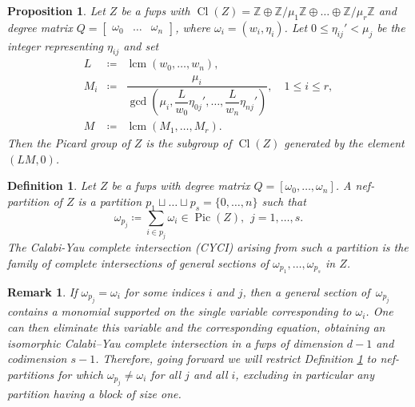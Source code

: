 \documentclass[10pt,a4paper]{amsart}
\newtheorem{proposition}{Proposition}
\newtheorem{definition}{Definition}
\newtheorem{remark}{Remark}
\DeclareMathOperator{\Cl}{Cl}
\DeclareMathOperator{\Pic}{Pic}
\newcommand{\Z}{\mathbb{Z}}
\DeclareMathOperator{\lcm}{lcm}
\begin{document}
\begin{proposition} \label{prop:pic}
    Let $Z$ be a fwps with $\Cl(Z)=\Z\oplus \Z/\mu_1\Z\oplus\dots\oplus\Z/\mu_r\Z$ and degree matrix $Q=\begin{bmatrix}
        \omega_0 & \dots & \omega_n
    \end{bmatrix}$, where $\omega_i=(w_i,\eta_i)$.
    Let $0\leq\eta_{ij}'<\mu_j$ be the integer representing $\eta_{ij}$ and set
    \[
    \begin{array}{lcll}  
    L & \coloneqq & \lcm(w_0,\dots,w_n),
    \\[6pt]
    M_i & \coloneqq & \dfrac{\mu_i}{\gcd\left(\mu_i,\dfrac{L}{w_0}\eta_{0j}',\dots,\dfrac{L}{w_n}\eta_{nj}'\right)}, \quad 1 \le i \le r,
    \\[24pt]
    M & \coloneqq & \lcm(M_1,\dots,M_r).
    \end{array}
    \] 
    Then the Picard group of $Z$ is the subgroup of $\Cl(Z)$ generated by the element~$(LM,0)$.
\end{proposition}

\begin{definition}\label{def:nef-part}
    Let $Z$ be a fwps with degree matrix $Q=[\omega_0,\dots,\omega_n]$. A \emph{nef-partition} of $Z$ is a partition $p_1\sqcup\dots\sqcup p_s=\{0,\dots,n\}$ such that
    $$\omega_{p_j}\coloneq\sum_{i\in p_j}\omega_i\in\Pic(Z), \hspace{5pt} j=1,\dots,s.$$
    The \emph{Calabi-Yau complete intersection (CYCI)} arising from such a partition is the family of complete intersections of general sections of $\omega_{p_1},\dots,\omega_{p_s}$ in $Z$.
\end{definition}

\begin{remark}\label{rem:linear-elimination} 
If $\omega_{p_j}=\omega_i$ for some indices $i$ and $j$, then a general section of~$\omega_{p_j}$ contains a monomial supported on the single
variable corresponding to $\omega_i$.
One can then eliminate this variable and the corresponding equation, obtaining an
isomorphic Calabi--Yau complete intersection in a fwps of dimension $d-1$ and codimension
$s-1$. Therefore, going forward we will restrict Definition \ref{def:nef-part} to nef-partitions for which
$\omega_{p_j}\neq \omega_i$ for all $j$ and all $i$, excluding in particular any partition having a
block of size one.
\end{remark}
\end{document}
